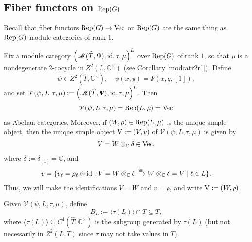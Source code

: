 \documentclass{amsart}
\theoremstyle{definition}
\newcommand{\id}{{\rm id}}
\newcommand{\Rep}{{\rm Rep}}
\newcommand{\Vect}{{\rm Vec}}
\newcommand{\M}{\mathscr{M}}
\newcommand{\V}{\mathscr{V}}
\newcommand{\ot}{\otimes}
\numberwithin{equation}{section}
\begin{document}
\subsection{Fiber functors on ${\rm Rep}(G)$}\label{sec:Fiber functors on RepG}
Recall that fiber functors $\Rep(G)\to\Vect$ on $\Rep(G)$ are the same thing as $\Rep(G)$-module categories of rank $1$. 

Fix a module category $\left(\M(\widehat{T},\Psi),\id,\tau,\mu\right)^L$ over $\Rep(G)$ of rank $1$, so that $\mu$ is a nondegenerate $2$-cocycle in $Z^2(L,\mathbb{C}^{\times})$ (see Corollary \ref{modcatr2r1}). Define 
$$\psi\in Z^2(\widehat{T},\mathbb{C}^{\times}),\quad \psi(x,y)=\Psi(x,y,[1]),$$
and set $\V(\psi,L,\tau,\mu):=\left(\M(\widehat{T},\Psi),\id,\tau,\mu\right)^L$. Then
\begin{equation}\label{defnofV}
\V(\psi,L,\tau,\mu)=\Rep(L,\mu)=\Vect
\end{equation}
as Abelian categories. Moreover, if $(W,\rho)\in {\rm Rep}(L,\mu)$ is the unique simple object, then  
the unique simple object ${\rm V}:=(V,v)$ of $\V(\psi,L,\tau,\mu)$ is given by  
\begin{equation*}
V=W\ot_{\mathbb{C}}\delta\in \Vect,
\end{equation*}
where $\delta:=\delta_{[1]}=\mathbb{C}$, and
\begin{equation*}
v=\{v_{\ell}=\rho_{\ell}\ot \id:V=W\ot_{\mathbb{C}}\delta\xrightarrow{\cong} W\ot_{\mathbb{C}}\delta=V\mid \ell\in L\}.
\end{equation*} 
Thus, we will make the identifications $V=W$ and $v=\rho$, and write ${\rm V}:=(W,\rho)$.

Given $\V(\psi,L,\tau,\mu)$, define 
\begin{equation}\label{defbl}
B_L:=\langle\tau(L)\rangle \cap T\subseteq T,
\end{equation} 
where $\langle \tau(L)\rangle\subseteq C^1(\widehat{T},\mathbb{C}^{\times})$ is the subgroup generated by $\tau(L)$ (but not necessarily in $Z^2(L,T)$ since $\tau$ may not take values in $T$).
\end{document}
